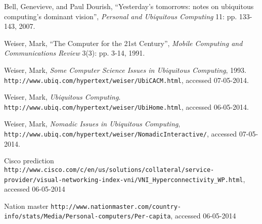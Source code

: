 \begin{thebibliography}{9}

        Bell, Genevieve, and Paul Dourish,
        ``Yesterday's tomorrows: notes on ubiquitous computing's dominant vision'',
        \emph{Personal and Ubiquitous Computing} 11: pp. 133-143,
        2007.
        
        Weiser, Mark,
        ``The Computer for the 21st Century'',
        \emph{Mobile Computing and Communications Review} 3(3): pp. 3-14,
        1991.
		
		Weiser, Mark,
		\emph{Some Computer Science Issues in Ubiquitous Computing},
		1993.
		\verb+http://www.ubiq.com/hypertext/weiser/UbiCACM.html+, accessed 07-05-2014.
        
        Weiser, Mark,
        \emph{Ubiquitous Computing}.
        \verb+http://www.ubiq.com/hypertext/weiser/UbiHome.html+, accessed 06-05-2014.
        
		Weiser, Mark,
		\emph{Nomadic Issues in Ubiquitous Computing},
		\verb+http://www.ubiq.com/hypertext/weiser/NomadicInteractive/+, accessed 07-05-2014.
		
        Cisco prediction
        \verb+http://www.cisco.com/c/en/us/solutions/collateral/service-provider/visual-networking-index-vni/VNI_Hyperconnectivity_WP.html+, accessed 06-05-2014
        
        Nation master
        \verb+http://www.nationmaster.com/country-info/stats/Media/Personal-computers/Per-capita+, accessed 06-05-2014
 
\end{thebibliography}